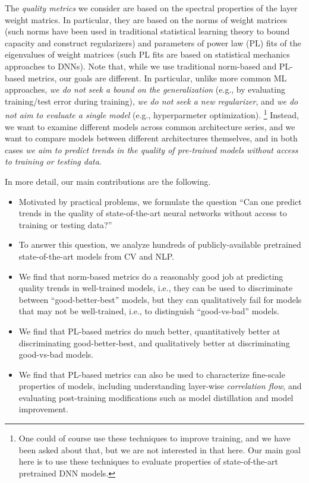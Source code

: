 The \emph{quality metrics} we consider are based on the spectral properties of the layer weight matrics.
In particular, they are based on the norms of weight matrices (such norms have been used in traditional statistical learning theory to bound capacity and construct regularizers) and parameters of power law (PL) fits of the eigenvalues of weight matrices (such PL fits are based on statistical mechanics approaches to DNNs).
Note that, while we use traditional norm-based and PL-based metrics, our goals are different.
In particular, unlike more common ML approaches, \emph{we do not seek a bound on the generalization} (e.g., by evaluating training/test error during training), \emph{we do not seek a new regularizer}, and \emph{we do not aim to evaluate a single model} (e.g., hyperparmeter optimization).%
\footnote{One could of course use these techniques to improve training, and we have been asked about that, but we are not interested in that here. Our main goal here is to use these techniques to evaluate properties of state-of-the-art pretrained DNN models.}
Instead, we want to examine different models across common architecture series, and we want to compare models between different architectures themselves, and in both cases \emph{we aim to predict trends in the quality of pre-trained models without access to training or testing data}.  


In more detail, our main contributions are the following.
\begin{itemize}[leftmargin=*]
\item 
Motivated by practical problems, we formulate the question ``Can one predict trends in the quality of state-of-the-art neural networks without access to training or testing data?''
\item
To answer this question, we analyze hundreds of publicly-available pretrained state-of-the-art models from CV and NLP.
\item 
We find that norm-based metrics do a reasonably good job at predicting quality trends in well-trained models, i.e., they can be used to discriminate between ``good-better-best'' models, but they can qualitatively fail for models that may not be well-trained, i.e., to distinguish ``good-vs-bad'' models.
\item 
We find that PL-based metrics do much better, quantitatively better at discriminating good-better-best, and qualitatively better at discriminating good-vs-bad models.
\item 
We find that PL-based metrics can also be used to characterize fine-scale properties of models, including understanding layer-wise \emph{correlation flow}, and evaluating post-training modifications such as model distillation and model improvement.
\end{itemize}

